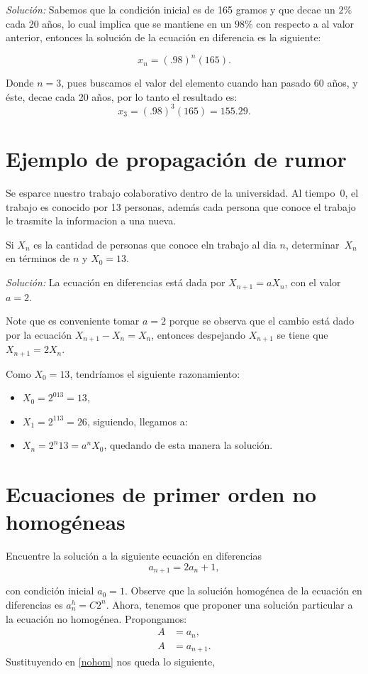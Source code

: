 \documentclass{report}
\begin{document}
\textit{Solución:} Sabemos que la condición inicial es de 165 gramos y
que decae un $2\%$ cada 20 años, lo cual implica que se mantiene en un
$98\%$ con respecto a al valor anterior, entonces la solución de la
ecuación en diferencia es la siguiente:

$$x_{n}=(.98)^n(165).$$

Donde $n=3$, pues buscamos el valor del elemento cuando han pasado 60
años, y éste, decae cada 20 años, por lo tanto el resultado es:
$$x_{3}=(.98)^3(165)= 155.29.$$

\section{Ejemplo de propagación de rumor}

Se esparce nuestro trabajo colaborativo dentro de la universidad. Al
tiempo~0, el trabajo es conocido por 13 personas, además cada persona que
conoce el trabajo le trasmite la informacion a una nueva.

Si $X_n$ es la cantidad de personas que conoce eln trabajo al dia  $n$,
determinar~$X_n$ en términos de $n$ y $X_0=13$.

\textit{Solución:} La ecuación en diferencias está dada por
$X_{n+1}=aX_n$, con el valor~$a=2$.

Note que es conveniente tomar $a=2$ porque se observa que el cambio
está dado por la ecuación $X_{n+1}-X_{n}=X_{n}$, entonces despejando
$X_{n+1}$ se tiene que~$X_{n+1}=2X_n$.

Como $X_0=13$, tendríamos el siguiente razonamiento:
\begin{itemize}
\item $X_0=2^013=13$,
\item $X_1=2^113=26$, siguiendo, llegamos a:
\item $X_n=2^n13=a^nX_0$, quedando de esta manera la solución.
\end{itemize}


\section{Ecuaciones de primer orden no homogéneas}
Encuentre la solución a la siguiente ecuación en diferencias
\begin{equation}
  \label{nohom}
  a_{n+1}=2a_{n}+1,
\end{equation}

con condición inicial $a_{0}=1$.
Observe que la solución homogénea de la ecuación en diferencias  es $a_{n}^h=C2^n$.
Ahora, tenemos que proponer una solución particular a la ecuación no homogénea.
Propongamos:
\begin{align*}
  A&=a_n,\\
  A&=a_{n+1}.
\end{align*}
Sustituyendo en \ref{nohom} nos queda lo siguiente,
\end{document}
